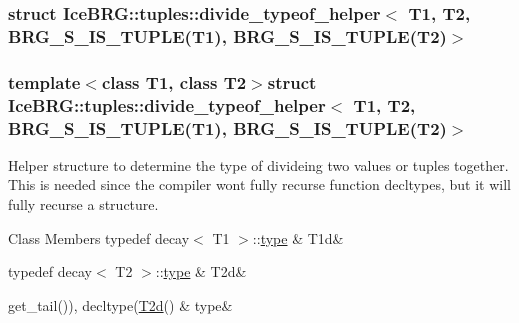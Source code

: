 \subsubsection{struct Ice\+B\+R\+G\+:\+:tuples\+:\+:divide\+\_\+typeof\+\_\+helper$<$ T1, T2, B\+R\+G\+\_\+\+S\+\_\+\+I\+S\+\_\+\+T\+U\+P\+L\+E(T1), B\+R\+G\+\_\+\+S\+\_\+\+I\+S\+\_\+\+T\+U\+P\+L\+E(T2)$>$}
\subsubsection*{template$<$class T1, class T2$>$struct Ice\+B\+R\+G\+::tuples\+::divide\+\_\+typeof\+\_\+helper$<$ T1, T2, B\+R\+G\+\_\+\+S\+\_\+\+I\+S\+\_\+\+T\+U\+P\+L\+E(\+T1), B\+R\+G\+\_\+\+S\+\_\+\+I\+S\+\_\+\+T\+U\+P\+L\+E(\+T2)$>$}

Helper structure to determine the type of divideing two values or tuples together. This is needed since the compiler won\textquotesingle{}t fully recurse function decltypes, but it will fully recurse a structure. \begin{DoxyFields}{Class Members}
\hypertarget{namespaceIceBRG_1_1tuples_a5dd19ded108a7f6bd9a1b80f80ef27ef}{}typedef decay$<$ T1 $>$\+::\hyperlink{namespaceIceBRG_1_1tuples_ab30c942f5de4c1473701c0a3a7454453}{type}\label{namespaceIceBRG_1_1tuples_a5dd19ded108a7f6bd9a1b80f80ef27ef}
&
T1d&
\\
\hline

\hypertarget{namespaceIceBRG_1_1tuples_acb789365c7ce7dbcbcb954d579bd4797}{}typedef decay$<$ T2 $>$\+::\hyperlink{namespaceIceBRG_1_1tuples_ab30c942f5de4c1473701c0a3a7454453}{type}\label{namespaceIceBRG_1_1tuples_acb789365c7ce7dbcbcb954d579bd4797}
&
T2d&
\\
\hline

\hypertarget{namespaceIceBRG_1_1tuples_ab30c942f5de4c1473701c0a3a7454453}{}get\+\_\+tail()), decltype(\hyperlink{namespaceIceBRG_1_1tuples_acb789365c7ce7dbcbcb954d579bd4797}{T2d}()\label{namespaceIceBRG_1_1tuples_ab30c942f5de4c1473701c0a3a7454453}
&
type&
\\
\hline

\end{DoxyFields}
\label{structIceBRG_1_1tuples_1_1divide__typeof__helper_3_01T1_00_01T2_00_01BRG__S__IS__TUPLE_07T1_08_086c96d3c3ec89211a6e76f31c5665b8a}
\hypertarget{namespaceIceBRG_1_1tuples_structIceBRG_1_1tuples_1_1divide__typeof__helper_3_01T1_00_01T2_00_01BRG__S__IS__TUPLE_07T1_08_086c96d3c3ec89211a6e76f31c5665b8a}{}
